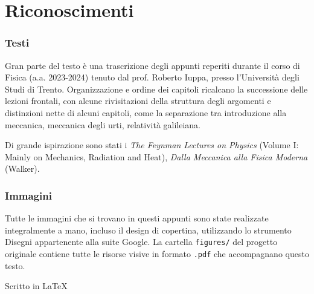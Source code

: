 \section*{Riconoscimenti}

\subsubsection*{Testi}
Gran parte del testo è una trascrizione degli appunti reperiti durante
il corso di Fisica (a.a. 2023-2024) tenuto dal prof. Roberto Iuppa, presso
l'Università degli Studi di Trento. Organizzazione e ordine dei
capitoli ricalcano la successione delle lezioni frontali, con alcune
rivisitazioni della struttura degli argomenti e distinzioni nette di
alcuni capitoli, come la separazione tra introduzione alla meccanica,
meccanica degli urti, relatività galileiana.

Di grande ispirazione sono stati i \textit{The Feynman Lectures on Physics}
(Volume I: Mainly on Mechanics, Radiation and Heat), \textit{Dalla Meccanica
alla Fisica Moderna} (Walker).

\subsubsection*{Immagini}
Tutte le immagini che si trovano in questi appunti sono state realizzate
integralmente a mano, incluso il design di copertina, utilizzando
lo strumento Disegni appartenente alla suite Google. La cartella
\texttt{figures/} del progetto originale contiene tutte le risorse visive
in formato \texttt{.pdf} che accompagnano questo testo.

\vfill
\begin{center}
    Scritto in \LaTeX
\end{center}